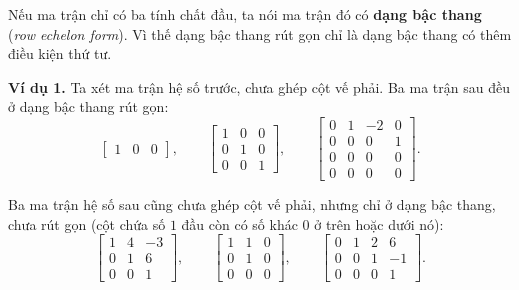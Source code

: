 \documentclass[12pt,a4paper]{article}
\begin{document}
Nếu ma trận chỉ có ba tính chất đầu, ta nói ma trận đó có \textbf{dạng bậc thang} (\emph{row echelon form}). Vì thế dạng bậc thang rút gọn chỉ là dạng bậc thang có thêm điều kiện thứ tư.

\textbf{Ví dụ 1.} Ta xét ma trận hệ số trước, chưa ghép cột vế phải. Ba ma trận sau đều ở dạng bậc thang rút gọn:
$$
\left[ \begin{array}{ccc} 1 & 0 & 0 \end{array} \right],\qquad
\left[ \begin{array}{ccc} 1 & 0 & 0 \\ 0 & 1 & 0 \\ 0 & 0 & 1 \end{array} \right],\qquad
\left[ \begin{array}{cccc} 0 & 1 & -2 & 0 \\ 0 & 0 & 0 & 1 \\ 0 & 0 & 0 & 0 \\ 0 & 0 & 0 & 0 \end{array} \right].
$$

Ba ma trận hệ số sau cũng chưa ghép cột vế phải, nhưng chỉ ở dạng bậc thang, chưa rút gọn (cột chứa số \(1\) đầu còn có số khác \(0\) ở trên hoặc dưới nó):
$$
\left[ \begin{array}{ccc} 1 & 4 & -3 \\ 0 & 1 & 6 \\ 0 & 0 & 1 \end{array} \right],\qquad
\left[ \begin{array}{ccc} 1 & 1 & 0 \\ 0 & 1 & 0 \\ 0 & 0 & 0 \end{array} \right],\qquad
\left[ \begin{array}{cccc} 0 & 1 & 2 & 6 \\ 0 & 0 & 1 & -1 \\ 0 & 0 & 0 & 1 \end{array} \right].
$$
\end{document}
